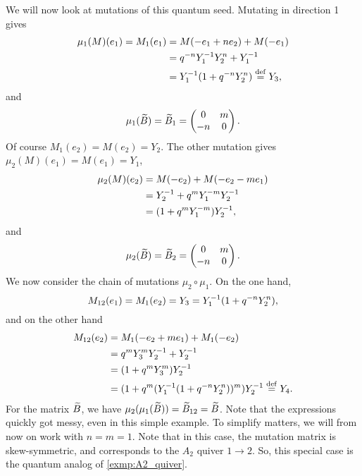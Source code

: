 We will now look at mutations of this quantum seed. Mutating in direction 1 gives
\begin{align*}
	\mu_1(M)(e_1) = M_1(e_1)
	 & = M(-e_1 + n e_2) + M(-e_1)             \\
	 & = q^{-n}Y_1^{-1}Y_2^n + Y_1^{-1}         \\
	 & = Y_1^{-1} (1 + q^{-n}Y_2^n) \overset{\mathrm{def}}{=} Y_3,
\end{align*}
and
\begin{equation*}
	\mu_1(\widetilde{B}) = \widetilde{B}_1 = \begin{pmatrix}
		0  & m \\
		-n & 0
	\end{pmatrix}.
\end{equation*}
%
Of course $M_1(e_2) = M(e_2) = Y_2$. The other mutation gives $\mu_2(M)(e_1) = M(e_1) =
	Y_1$,
\begin{align*}
	\mu_2(M)(e_2) & = M(-e_2) + M(-e_2 - m e_1)     \\
	              & = Y_2^{-1} + q^m Y_1^{-m}Y_2^{-1} \\
	              & = (1 + q^mY_1^{-m})Y_2^{-1},
\end{align*}
and
\begin{equation*}
	\mu_2(\widetilde{B}) = \widetilde{B}_2 = \begin{pmatrix}
		0  & m \\
		-n & 0
	\end{pmatrix}.
\end{equation*}
%
We now consider the chain of mutations $\mu_2 \circ \mu_1$. On the one hand,
\begin{equation*}
	M_{12}(e_1) = M_1(e_2) = Y_3 = Y_1 ^{-1} (1 + q^{-n}Y_2^n),
\end{equation*}
and on the other hand
\begin{align*}
	M_{12}(e_2)
	 & = M_1(-e_2 + m e_1) + M_1(-e_2)                               \\
	 & = q^{m}Y_3^m Y_2^{-1} + Y_2^{-1}                                \\
	 & = (1 + q^m Y_3^m) Y_2^{-1}                                     \\
	 & = (1 + q^m (Y_1 ^{-1} (1 + q^{-n}Y_2^n))^m)Y_2^{-1} \overset{\mathrm{def}}{=} Y_4.
\end{align*}
%
For the matrix $\widetilde{B}$, we have $\mu_2 (\mu_1(\widetilde{B})) = \widetilde{B}_{12} = \widetilde{B}$. Note that the
expressions quickly got messy, even in this simple example. To simplify matters, we
will from now on work with $n = m = 1$. Note that in this case, the mutation matrix is
skew-symmetric, and corresponds to the $A_2$ quiver $1 \to 2$. So, this special case is
the quantum analog of \cref{exmp:A2_quiver}.

